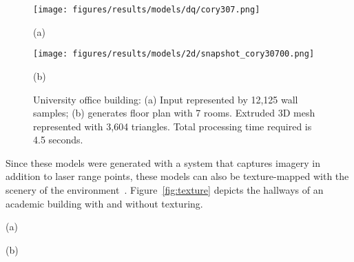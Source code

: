 \documentclass[a4paper,twoside]{article}
\begin{document}
\begin{figure}[t]
	\centering
	
	\begin{minipage}[b]{0.75\linewidth}
	\centerline{\texttt{[image: figures/results/models/dq/cory307.png]}}
	\centerline{(a)}
	\end{minipage}
	\hfill
	\begin{minipage}[b]{0.75\linewidth}
	\centerline{\texttt{[image: figures/results/models/2d/snapshot\_cory30700.png]}}
	\centerline{(b)}
	\end{minipage}

	\caption{University office building: (a) Input represented by 12,125 wall samples; (b) generates floor plan with 7 rooms. Extruded 3D mesh represented with 3,604 triangles.  Total processing time required is 4.5 seconds.}
	\label{fig:results_e}
\end{figure}


Since these models were generated with a system that captures imagery in addition to laser range points, these models can also be texture-mapped with the scenery of the environment~\cite{Cheng13}.  Figure~\ref{fig:texture} depicts the hallways of an academic building with and without texturing.

\begin{figure*}[t]
   \centering
   \centerline{(a)}
   \hfill
   \centerline{(b)}
   \caption{Interior view of 3D extruded reconstructed model: (a) without and (b) with texture-mapping~\cite{Cheng13}.}
   \label{fig:texture}
\end{figure*}
\end{document}
